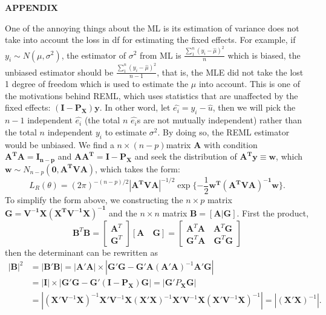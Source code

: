\documentclass[12pt]{article}
\begin{document}
    \begin{center}
        {\bf APPENDIX}
    \end{center}
    One of the annoying things about the ML is its estimation of variance does not take into account the loss in df for estimating the fixed effects. For example, if $y_i\sim N(\mu,\sigma^2)$, the estimator of $\sigma^2$ from ML is $\frac{\sum_1^n(y_i-\hat{\mu})^2}{n}$ which is biased, the unbiased estimator should be $\frac{\sum_1^n(y_i-\hat{\mu})^2}{n-1}$, that is, the MLE did not take the lost 1 degree of freedom which is used to estimate the $\mu$ into account. This is one of the motivations behind REML, which uses statistics that are unaffected by the fixed effects: $\mathbf{(I-P_X)y}$. In other word, let $\hat{e_i}=y_i-\hat{u}$, then we will pick the $n-1$ independent $\hat{e_i}$ (the total $n$ $\hat{e_i}$s are not mutually independent) rather than the total $n$ independent $y_i$ to estimate $\sigma^2$. By doing so, the REML estimator would be unbiased. We find a $n\times (n-p)$matrix $\mathbf{A}$ with condition $\mathbf{A^TA=I_{n-p}}$ and $\mathbf{AA^T=I-P_X}$ and seek the distribution of $\mathbf{A^Ty\equiv w}$, which $\mathbf{w}\sim N_{n-p}(\mathbf{0,A^TVA})$, which takes the form:
    \begin{equation*}
        L_R(\theta)=(2\pi)^{-(n-p)/2}|\mathbf{A^TVA}|^{-1/2}\exp\{-\frac{1}{2}\mathbf{w^T(A^TVA)^{-1}w}\}.
    \end{equation*}
    To simplify the form above, we constructing the $n\times p$ matrix $\mathbf{G=V^{-1}X(X^TV^{-1}X)^{-1}}$ and the $n\times n$ matrix $\mathbf{B=[A|G]}$. First the product,
    \begin{equation*}
    \textbf{B}^T\textbf{B}=\begin{bmatrix}
        \textbf{A}^T\\
        \textbf{G}^T
        \end{bmatrix}
        [\mathbf{A}\quad \mathbf{G}]=\begin{bmatrix}
        \mathbf{A}^T\mathbf{A} \quad \mathbf{A}^T\mathbf{G}\\
        \mathbf{G}^T\mathbf{A} \quad \mathbf{G}^T\mathbf{G}
        \end{bmatrix}
    \end{equation*}
    then the determinant can be rewritten as
    \begin{equation*}
    \begin{split}
    |\textbf{B}|^2&=|\textbf{B}'\textbf{B}|=|\mathbf{A}'\mathbf{A}|\times|\mathbf{G}'\mathbf{G}-\mathbf{G}'\mathbf{A}(\mathbf{A}'\mathbf{A})^{-1}\mathbf{A}'\mathbf{G}|\\
    &=|\textbf{I}|\times|\mathbf{G}'\mathbf{G}-\mathbf{G}'(\mathbf{I-P_X})\mathbf{G}|=|\mathbf{G}'P_\mathbf{X}\mathbf{G}|\\
    &=|(\mathbf{X}'\mathbf{V}^{-1}\mathbf{X})^{-1}\mathbf{X}'\mathbf{V}^{-1}\mathbf{X}(\mathbf{X}'\mathbf{X})^{-1}\mathbf{X}'\mathbf{V}^{-1}\mathbf{X}(\mathbf{X}'\mathbf{V}^{-1}\mathbf{X})^{-1}|=|(\mathbf{X}'\mathbf{X})^{-1}|.
    \end{split}
    \end{equation*}
\end{document}
